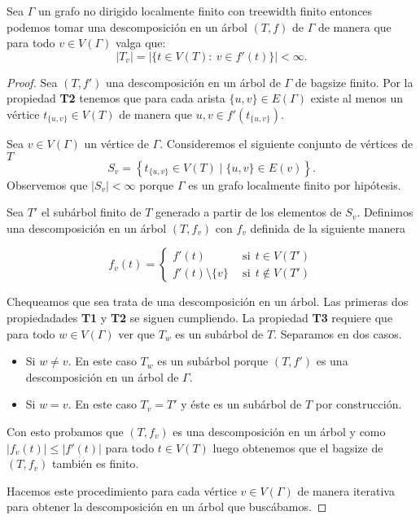 \documentclass[tesis.tex]{subfiles}
\begin{document}
\begin{prop}\label{prop_tw_finitos_bolsones}
	Sea $\Gamma$ un grafo no dirigido localmente finito con treewidth finito entonces podemos tomar una descomposición en un árbol $(T,f)$ de $\Gamma$ de manera que para todo $v \in V(\Gamma)$ valga que:
	\[
	|T_{v}| = | \{  t \in V(T) : \ v \in f'(t)  \} | < \infty.
	\]
\end{prop}
\begin{proof}
	Sea $(T,f')$ una descomposición en un árbol de $\Gamma$ de bagsize finito.
	Por la propiedad \textbf{T2} tenemos que para cada arista 
	$\{u,v\} \in E(\Gamma)$ existe al menos un vértice $t_{\{u,v\}} \in V(T)$ de manera que $u,v \in f'(t_{\{u,v\}})$.
	
	Sea $v \in V(\Gamma)$ un vértice  de $\Gamma$.
	Consideremos el siguiente conjunto de vértices de $T$
	\[
		S_{v} =  \left\{  t_{\{u,v\}} \in V(T) \mid \{u,v\} \in E(v)  \right\}.
	\]
	Observemos que $|S_{v}| < \infty$ porque $\Gamma$ es un grafo localmente finito por hipótesis.

	Sea $T'$ el subárbol finito de $T$ generado a partir de los elementos de $S_{v}$.
	Definimos una descomposición en un árbol $(T,f_{v})$ con $f_{v}$ definida de la siguiente manera
	
	\[
	f_{v}(t) = 
	\begin{cases}
		f'(t)  \ \  &\text{si} \ \  t \in V(T') \\
		f'(t) \setminus \{  v \} \ \  &\text{si} \ \  t \notin V(T')
	\end{cases}
	\]
	
	
	Chequeamos que sea trata de una descomposición en un árbol.
	Las primeras dos propiedadades \textbf{T1} y \textbf{T2} se siguen cumpliendo.
	La propiedad \textbf{T3} requiere que para todo $w \in V(\Gamma)$ ver que $T_{w}$ es un subárbol de $T$.
	Separamos en dos casos.
	\begin{itemize}
		\item Si $w \neq v$. 
			En este caso $T_{w}$ es un subárbol porque $(T,f')$ es una descomposición en un árbol de $\Gamma$.

		\item Si $w = v$.
			En este caso $T_{v} = T'$ y éste es un subárbol de $T$ por construcción.
	\end{itemize}
	
	Con esto probamos que $(T,f_{v})$ es una descomposición en un árbol y como $|f_{v}(t)| \le |f'(t)|$ para todo $t \in V(T)$ luego obtenemos que el bagsize de $(T,f_{v})$ también es finito.
	
	Hacemos este procedimiento para cada vértice $v \in V(\Gamma)$ de manera iterativa para obtener la descomposición en un árbol que buscábamos.
	
\end{proof}
\end{document}
